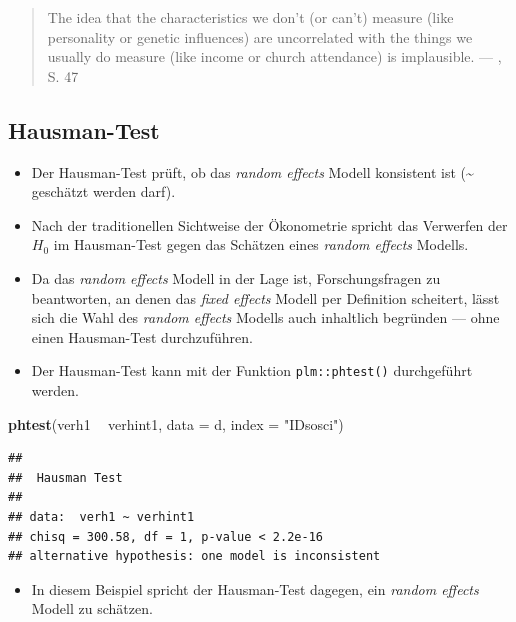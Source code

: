 \documentclass[
]{book}
\newenvironment{Shaded}{\begin{snugshade}}{\end{snugshade}}
\newcommand{\DataTypeTok}[1]{\textcolor[rgb]{0.13,0.29,0.53}{#1}}
\newcommand{\KeywordTok}[1]{\textcolor[rgb]{0.13,0.29,0.53}{\textbf{#1}}}
\newcommand{\NormalTok}[1]{#1}
\newcommand{\OperatorTok}[1]{\textcolor[rgb]{0.81,0.36,0.00}{\textbf{#1}}}
\newcommand{\StringTok}[1]{\textcolor[rgb]{0.31,0.60,0.02}{#1}}
\providecommand{\tightlist}{%
  \setlength{\itemsep}{0pt}\setlength{\parskip}{0pt}}
\begin{document}
\begin{quote}
The idea that the characteristics we don't (or can't) measure (like personality or genetic influences) are uncorrelated with the things we usually do measure (like income or church attendance) is implausible. --- \citet{vaiseyWhatYouCan2017}, S. 47
\end{quote}

\hypertarget{hausman-test}{%
\subsection*{Hausman-Test}\label{hausman-test}}

\begin{itemize}
\tightlist
\item
  Der Hausman-Test prüft, ob das \emph{random effects} Modell konsistent ist (\textasciitilde{} geschätzt werden darf).
\item
  Nach der traditionellen Sichtweise der Ökonometrie spricht das Verwerfen der \(H_0\) im Hausman-Test gegen das Schätzen eines \emph{random effects} Modells.
\item
  Da das \emph{random effects} Modell in der Lage ist, Forschungsfragen zu beantworten, an denen das \emph{fixed effects} Modell per Definition scheitert, lässt sich die Wahl des \emph{random effects} Modells auch inhaltlich begründen --- ohne einen Hausman-Test durchzuführen.
\item
  Der Hausman-Test kann mit der Funktion \texttt{plm::phtest()} durchgeführt werden.
\end{itemize}

\begin{Shaded}
\begin{Highlighting}[]
\KeywordTok{phtest}\NormalTok{(verh1 }\OperatorTok{~}\StringTok{ }\NormalTok{verhint1, }\DataTypeTok{data =}\NormalTok{ d, }\DataTypeTok{index =} \StringTok{"IDsosci"}\NormalTok{)}
\end{Highlighting}
\end{Shaded}

\begin{verbatim}
## 
##  Hausman Test
## 
## data:  verh1 ~ verhint1
## chisq = 300.58, df = 1, p-value < 2.2e-16
## alternative hypothesis: one model is inconsistent
\end{verbatim}

\begin{itemize}
\tightlist
\item
  In diesem Beispiel spricht der Hausman-Test dagegen, ein \emph{random effects} Modell zu schätzen.
\end{itemize}
\end{document}
